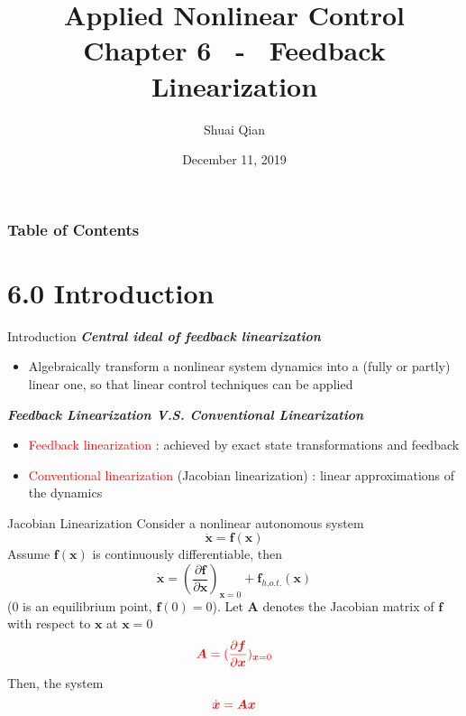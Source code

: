 \documentclass{beamer}
\title{Applied Nonlinear Control \\
        \large Chapter 6 ~-~ Feedback Linearization}
\author{\large Shuai Qian}
\date{December 11, 2019}
\institute{School of Automation \\
        Nanjing University of Science and Technology}
\renewcommand{\vec}[1]{\ensuremath{\boldsymbol{#1}}} %
\begin{document}
  \maketitle

  \begin{frame}
  \addtocounter{framenumber}{-2}
  \frametitle{Table of Contents}
  \thispagestyle{empty}
  \tableofcontents
  \end{frame}

  \section{6.0  Introduction}

  \begin{frame}{Introduction}
    \textbf{\textit{Central ideal of feedback linearization}}
    \begin{itemize}
      \item {\color{red}Algebraically} transform a nonlinear system dynamics into a (fully or partly) linear one, so that linear control techniques can be applied
    \end{itemize}

    \textbf{\textit{Feedback Linearization V.S. Conventional Linearization}}
    \begin{itemize}
      \item \textcolor{red}{Feedback linearization} : achieved by exact state transformations and feedback
      \item \textcolor{red}{Conventional linearization} (Jacobian linearization) : linear approximations of the dynamics
    \end{itemize}
   \end{frame}


   \begin{frame}{Jacobian Linearization}
    Consider a nonlinear autonomous system
    \begin{equation}\label{nonlinear}
      \dot{\vec{x}} = \vec{f(x)}
    \end{equation}
    Assume $\vec{f(x)}$ is continuously differentiable, then
    $$
    \dot{\vec{x}} = (\frac{\partial \vec{f}}{\partial \vec{x}})_{\vec{x}=0} + \vec{f}_{h.o.t.}(\vec{x})
    $$
    (0 is an equilibrium point, $\vec{f}(0) = 0$).
    Let $\vec{A}$ denotes the Jacobian matrix of $\vec{f}$ with respect to $\vec{x}$ at $\vec{x}=0$
    $$
    {\color{red}\vec{A} = (\frac{\partial \vec{f}}{\partial \vec{x}})_{\vec{x}=0}}
    $$
    Then, the system
    $$
    {\color{red}\dot{\vec{x}} = \vec{Ax}}
    $$
   \end{frame}
\end{document}
